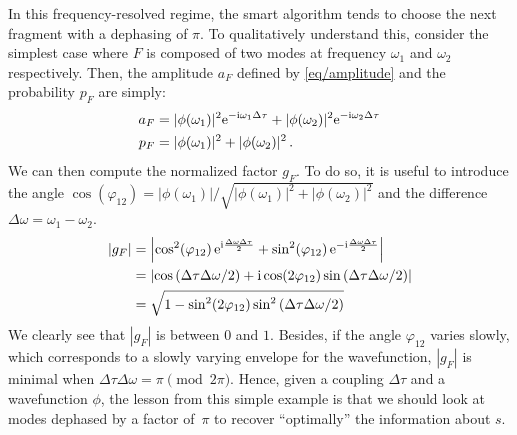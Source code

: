 \begin{example}
In this frequency-resolved regime, the smart algorithm tends to choose
the next fragment with a dephasing of $\pi$. To qualitatively understand
this, consider the simplest case where $F$ is composed of two modes at
frequency $\omega_1$ and $\omega_2$ respectively. Then, the amplitude 
$a_F$ defined by \cref{eq/amplitude} and the probability $p_F$ are simply:
%
\begin{align*}
a_F &= |\phi(\omega_1)|^2\mathrm{e}^{-\mathrm{i} \omega_1 \Delta\tau} + |\phi(\omega_2)|^2\mathrm{e}^{-\mathrm{i} \omega_2 \Delta\tau} \\
p_F &= |\phi(\omega_1)|^2+ |\phi(\omega_2)|^2
\,.
\end{align*}
We can then compute the normalized factor $g_F$. To do so, it is useful to introduce 
the angle $\cos(\varphi_{12}) = |\phi(\omega_1)| / \sqrt{|\phi(\omega_1)|^2+ |\phi(\omega_2)|^2}$
and the difference $\Delta\omega= \omega_1-\omega_2$.
%
\begin{align}
|g_F| &= \left| \cos^2 (\varphi_{12}) \, \mathrm{e}^{\mathrm{i}\frac{\Delta\omega\Delta\tau}{2}} 
	+ \sin^2 (\varphi_{12}) \, \mathrm{e}^{-\mathrm{i}\frac{\Delta\omega\Delta\tau}{2}} \right|
\nonumber\\
&= \left| \cos\left( \Delta\tau\Delta\omega /2 \right) +
	\mathrm{i} \cos(2\varphi_{12}) \sin\left( \Delta\tau\Delta\omega /2\right) \right|
\nonumber \\
&=\sqrt{1 - \sin^2(2\varphi_{12}) \sin^2\left( \Delta\tau\Delta\omega /2\right)}
\end{align}
We clearly see that $|g_F|$ is between $0$ and $1$. Besides, if the angle
$\varphi_{12}$ varies slowly, which corresponds to a slowly varying envelope
for the wavefunction, $|g_F|$ is minimal
when $\Delta\tau\Delta\omega = \pi \pmod{2 \pi}$. Hence, given a coupling
$\Delta\tau$ and a wavefunction $\phi$, the lesson from this simple example is
that we should look at modes dephased by a factor of~$\pi$ to recover ``optimally''
the information about $s$.
\end{example}

